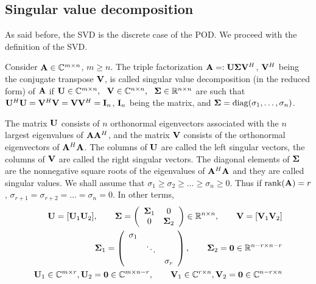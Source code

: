 \subsection{Singular value decomposition} \label{sec:SVD}

\par As said before, the SVD is the discrete case of the POD. We proceed with the definition of the SVD. \cite{TrefethenBauNLA, AntoulasALSDS}

\begin{mydef}
\label{def:SVD}
Consider $\mathbf{A} \in \mathbb{C}^{m \times n}$, $m \geq n$. The triple factorization $\mathbf{A} =: \mathbf{\mathbf{U}} \mathbf{\Sigma} \mathbf{V}^H$, $\mathbf{V}^H$ being the conjugate transpose $\mathbf{V}$, is called singular value decomposition (in the reduced form) of $\mathbf{A}$ if $ \mathbf{U} \in \mathbb{C}^{m \times n}, \ \ \mathbf{V} \in \mathbb{C}^{n \times n}, \ \
\mathbf{\Sigma} \in \mathbb{R}^{n \times n}$ are such that $\mathbf{U}^H \mathbf{U} = \mathbf{V}^H \mathbf{V} = \mathbf{V} \mathbf{V}^H = \mathbf{I}_n$, $\mathbf{I}_n$ being the  matrix, and $\mathbf{\Sigma} = \mathrm{diag}(\sigma_1, \ldots, \sigma_n)$.
\par The matrix $\mathbf{U}$ consists of $n$ orthonormal eigenvectors associated with the $n$ largest eigenvalues of $\mathbf{A} \mathbf{A}^H$, and the matrix $\mathbf{V}$ consists of the orthonormal eigenvectors of $\mathbf{A}^H \mathbf{A}$. The columns of $\mathbf{U}$ are called the left singular vectors, the columns of $\mathbf{V}$ are called the right singular vectors. The diagonal elements of $\mathbf{\Sigma}$ are the nonnegative square roots of the eigenvalues of $\mathbf{A}^H \mathbf{A}$ and they are called singular values. We shall assume that $\sigma_1 \geq \sigma_2 \geq \ldots \geq \sigma_n \geq 0$. Thus if $\mathrm{rank}(\mathbf{A}) = r$, $\sigma_{r+1} = \sigma_{r+2} = \ldots = \sigma_n = 0$. In other terms,
\begin{eqnarray*}
\mathbf{U} = [ \mathbf{U}_1 \mathbf{U}_2 ], \qquad \mathbf{\Sigma} = \left ( \begin{array}{c c} \mathbf{\Sigma}_1 & 0 \\ 0 & \mathbf{\Sigma}_2 \end{array} \right ) \in \mathbb{R}^{n \times n}, \qquad \mathbf{V} = [ \mathbf{V}_1 \mathbf{V}_2 ] \\
\mathbf{\Sigma}_1 = \left ( \begin{array}{c c c} \sigma_1 & & \\ & \ddots & \\ & & \sigma_r  \end{array} \right ), \qquad \mathbf{\Sigma}_2 = \mathbf{0} \in \mathbb{R}^{n-r \times n-r} \\
\mathbf{U}_1 \in \mathbb{C}^{m \times r}, \mathbf{U}_2 = \mathbf{0} \in \mathbb{C}^{m \times n-r}, \qquad \mathbf{V}_1 \in \mathbb{C}^{r \times n}, \mathbf{V}_2 = \mathbf{0} \in \mathbb{C}^{n-r \times n}
\end{eqnarray*}
\end{mydef}

